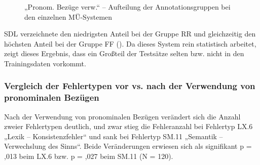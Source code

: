 \begin{figure}
\caption{\label{fig:05:63}„Pronom. Bezüge verw.“ -- Aufteilung der Annotationsgruppen bei den einzelnen MÜ-Systemen   }
\end{figure}

SDL verzeichnete den niedrigsten Anteil bei der Gruppe RR und gleichzeitig den höchsten Anteil bei der Gruppe FF (). Da dieses System rein statistisch arbeitet, zeigt dieses Ergebnis, dass ein Großteil der Testsätze selten bzw. nicht in den Trainingsdaten vorkommt.

\subsubsection{\label{sec:5.3.4.3}Vergleich der Fehlertypen vor vs. nach der Verwendung von pronominalen Bezügen}

Nach der Verwendung von pronominalen Bezügen verändert sich die Anzahl zweier Fehlertypen deutlich, und zwar stieg die Fehleranzahl bei Fehlertyp LX.6 „Lexik -- Konsistenzfehler“ und sank bei Fehlertyp SM.11 „Semantik -- Verwechslung des Sinns“. Beide Veränderungen erwiesen sich als signifikant p = ,013 beim LX.6 bzw. p = ,027 beim SM.11 (N = 120).


